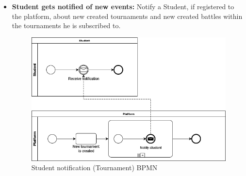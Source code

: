 \documentclass{article}
\begin{document}
{\begin{itemize}
          \newpage

    \item \textbf{Student gets notified of new events:} Notify a Student, if registered to the platform, about new created tournaments and
      new created battles within the tournaments he is subscribed to.
          \begin{figure}[H]
              \centering
              \includegraphics[scale=0.4]{images/BPMN/BPMN5.png}
              \caption{Student notification (Tournament) BPMN}
              \label{fig:studNotificationBPMN}
          \end{figure}


\end{itemize}}
\end{document}
